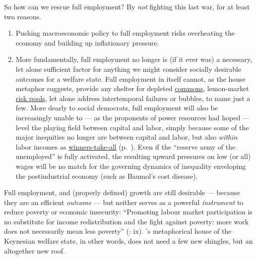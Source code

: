 \begin{description}
	So how can we rescue full employment? By \emph{not} fighting this last war, for at least two reasons.

	\begin{enumerate}
		\item Pushing macroeconomic policy to full employment risks overheating the economy and building up inflationary pressure.
		\item More fundamentally, full employment no longer is (if it ever was) a necessary, let alone sufficient factor for anything we might consider socially desirable outcomes for a welfare state. Full employment in itself cannot, as the house metaphor suggests, provide any shelter for depleted \hyperref[sec:common-good]{commons}, lemon-market \hyperref[sec:adverse-selection]{risk pools}, let alone address intertemporal failures or bubbles, to name just a few. More dearly to social democrats, full employment will also be increasingly unable to --- as the proponents of power resources had hoped --- level the playing field between capital and labor, simply because some of the major inequities no longer are between capital and labor, but also \emph{within} labor incomes as \hyperref[sec:winner-take-all]{winners-take-all} (p.~\pageref{sec:winner-take-all}). Even if the ``reserve army of the unemployed'' is fully activated, the resulting upward pressures on low (or all) wages will be no match for the governing dynamics of inequality enveloping the postindustrial economy (such as Baumol's cost disease).
	\end{enumerate}

	Full employment, and (properly defined) growth are still desirable --- because they are an efficient \emph{outcome} --- but neither serves as a powerful \emph{instrument} to reduce poverty or economic insecurity: ``Promoting labour market participation is no substitute for income redistribution and the fight against poverty: more work does not necessarily mean less poverty'' (\citealt{Esping-Andersen2002}: ix). \citeauthor{Offe2003}'s metaphorical house of the Keynesian welfare state, in other words, does not need a few new shingles, but an altogether new roof.


\end{description}
